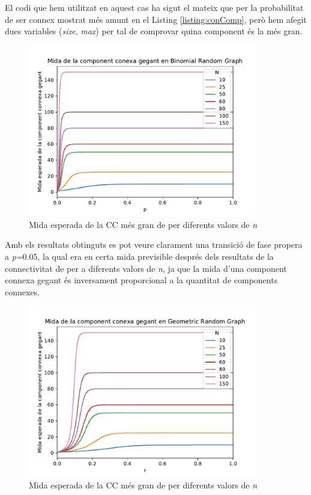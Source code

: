 El codi que hem utilitzat en aquest cas ha sigut el mateix que per la probabilitat de ser connex mostrat més amunt en el Listing \ref{listing:conComp}, però hem afegit dues variables (\textit{size}, \textit{max}) per tal de comprovar quina component és la més gran.

\begin{figure}[H]
    \centering
    \includegraphics[width=10cm]{plots/BRG_midaCompConMax.pdf}
    \caption{Mida esperada de la CC més gran de \BRG per diferents valors de \textit{n}}
    \label{fig:BRG_midaCompConMax}
\end{figure}

Amb els resultats obtinguts es pot veure clarament una transició de fase propera a \textit{p=}0.05, la qual era en certa mida previsible després dels resultats de la connectivitat de \BRG per a diferents valors de \textit{n}, ja que la mida d'una component connexa gegant és inversament proporcional a la quantitat de components connexes. %

\begin{figure}[H]
    \centering
    \includegraphics[width=10cm]{plots/GRG_midaCompConMax.pdf}
    \caption{Mida esperada de la CC més gran de \RGG per diferents valors de \textit{n}}
    \label{fig:GRG_midaCompConMax}
\end{figure}


